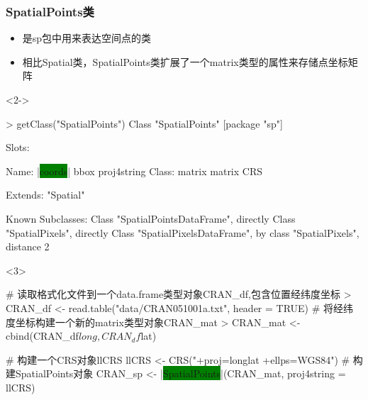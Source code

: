 \subsubsection{SpatialPoints类}
\begin{frame}[t,fragile]{\subsecname}{\subsubsecname}
\begin{itemize}
\item<1-> 是sp包中用来表达空间点的类
\item<2-> 相比Spatial类，SpatialPoints类扩展了一个matrix类型的属性来存储点坐标矩阵
\end{itemize}

\begin{overlayarea}{\textwidth}{\textheight}
\begin{onlyenv}<2->
\begin{rcode}
> getClass("SpatialPoints")
Class "SpatialPoints" [package "sp"]

Slots:
                                          
Name:       |\colorbox{green}{coords}|        bbox proj4string
Class:      matrix      matrix         CRS

Extends: "Spatial"

Known Subclasses: 
Class "SpatialPointsDataFrame", directly
Class "SpatialPixels", directly
Class "SpatialPixelsDataFrame", by class "SpatialPixels", distance 2
\end{rcode}
\end{onlyenv}

\begin{onlyenv}<3>
\begin{rcode}
# 读取格式化文件到一个data.frame类型对象CRAN\_df,包含位置经纬度坐标
> CRAN_df <- read.table("data/CRAN051001a.txt", header = TRUE)
# 将经纬度坐标构建一个新的matrix类型对象CRAN\_mat
> CRAN_mat <- cbind(CRAN_df$long, CRAN_df$lat)

# 构建一个CRS对象llCRS 
llCRS <- CRS("+proj=longlat +ellps=WGS84")
# 构建SpatialPoints对象
CRAN_sp <- |\colorbox{green}{SpatialPoints}|(CRAN_mat, proj4string = llCRS)
\end{rcode}
\end{onlyenv}
\end{overlayarea}
\end{frame}

